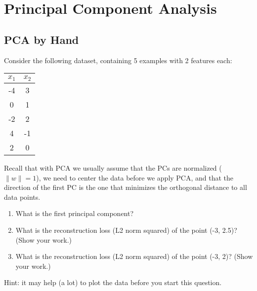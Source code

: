 \documentclass{article}
\def\blu#1{{\color{blu}#1}}
\def\norm#1{\|#1\|}
\def\enum#1{\begin{enumerate}#1\end{enumerate}}
\begin{document}
\section{Principal Component Analysis}
\subsection{PCA by Hand}

Consider the following dataset, containing 5 examples with 2 features each:
\begin{center}
\begin{tabular}{cc}
$x_1$ & $x_2$\\
\hline
-4 & 3\\
0 & 1\\
-2 & 2\\
4 & -1\\
2 & 0\\
\end{tabular}
\end{center}
Recall that with PCA we usually assume that the PCs are normalized ($\norm{w} = 1$), we need to center the data before we apply PCA, and that the direction of the first PC is the one that minimizes the orthogonal distance to all data points.
\blu{
\enum{
\item What is the first principal component?
\item What is the reconstruction loss (L2 norm squared) of the point (-3, 2.5)? (Show your work.)
\item What is the reconstruction loss (L2 norm squared) of the point (-3, 2)? (Show your work.)
}
}
Hint: it may help (a lot) to plot the data before you start this question.
\end{document}
